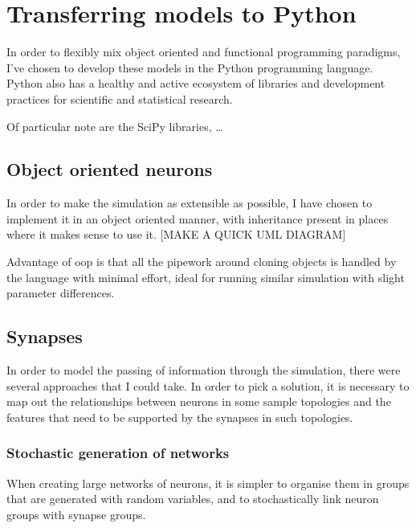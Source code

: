 

\section{Transferring models to Python}

In order to flexibly mix object oriented and functional programming paradigms,
I've chosen to develop these models in the Python programming language. Python
also has a healthy and active ecosystem of libraries and development practices
for scientific and statistical research.

Of particular note are the SciPy libraries, \ldots



\subsection{Object oriented neurons}

In order to make the simulation as extensible as possible, I have chosen to
implement it in an object oriented manner, with inheritance present in places
where it makes sense to use it. [MAKE A QUICK UML DIAGRAM]

Advantage of oop is that all the pipework around cloning objects is handled
by the language with minimal effort, ideal for running similar simulation with
slight parameter differences.

\subsection{Synapses}

In order to model the passing of information through the simulation, there were
several approaches that I could take. In order to pick a solution, it is
necessary to map out the relationships between neurons in some sample topologies
and the features that need to be supported by the synapses in such topologies.



\subsubsection{Stochastic generation of networks}

When creating large networks of neurons, it is simpler to organise them in
groups that are generated with random variables, and to stochastically link
neuron groups with synapse groups. 

